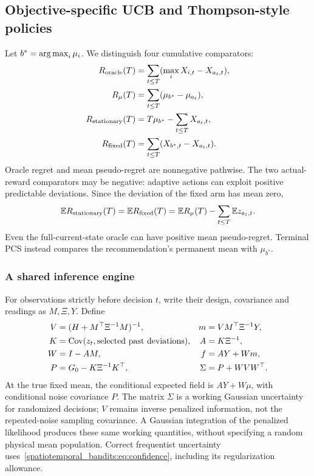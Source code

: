 \subsection{Objective-specific UCB and Thompson-style policies}
Let $b^*=\operatorname*{arg\,max}_i\mu_i$. We distinguish four cumulative comparators:
\begin{align}
R_{\rm oracle}(T)&=\sum_{t\le T}(\max_iX_{i,t}-X_{a_t,t}),\nonumber\\
R_\mu(T)&=\sum_{t\le T}(\mu_{b^*}-\mu_{a_t}),\label{spatiotemporal_bandits:eq:three-regrets}\\
R_{\rm stationary}(T)&=T\mu_{b^*}-\sum_{t\le T}X_{a_t,t},\nonumber\\
R_{\rm fixed}(T)&=\sum_{t\le T}(X_{b^*,t}-X_{a_t,t}).\nonumber
\end{align}
Oracle regret and mean pseudo-regret are nonnegative pathwise. The two actual-reward comparators may be negative: adaptive actions can exploit positive predictable deviations. Since the deviation of the fixed arm has mean zero,
\begin{equation}
\mathbb E R_{\rm stationary}(T)=\mathbb E R_{\rm fixed}(T)
=\mathbb E R_\mu(T)-\sum_{t\le T}\mathbb E z_{a_t,t}.
\end{equation}
Even the full-current-state oracle can have positive mean pseudo-regret. Terminal PCS instead compares the recommendation's permanent mean with $\mu_{b^*}$.

\subsubsection{A shared inference engine}
For observations strictly before decision $t$, write their design, covariance and readings as $M,\Xi,Y$. Define
\begin{align}
V&=(H+M^\top\Xi^{-1}M)^{-1},&m&=VM^\top\Xi^{-1}Y,\nonumber\\
K&=\operatorname{Cov}(z_t,\hbox{selected past deviations}),&A&=K\Xi^{-1},\nonumber\\
W&=I-AM,&f&=AY+Wm,\label{spatiotemporal_bandits:eq:forecast-working}\\
P&=G_0-K\Xi^{-1}K^\top,&\Sigma&=P+WVW^\top.\nonumber
\end{align}
At the true fixed mean, the conditional expected field is $AY+W\mu$, with conditional noise covariance $P$. The matrix $\Sigma$ is a working Gaussian uncertainty for randomized decisions; $V$ remains inverse penalized information, not the repeated-noise sampling covariance. A Gaussian integration of the penalized likelihood produces these same working quantities, without specifying a random physical mean population. Correct frequentist uncertainty uses~\eqref{spatiotemporal_bandits:eq:confidence}, including its regularization allowance.

